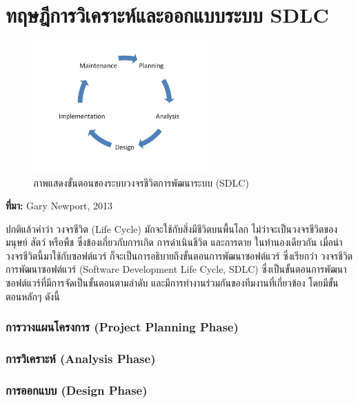 \clearpage


\section{ทฤษฎีการวิเคราะห์และออกแบบระบบ SDLC}

\begin{figure}[h!]
    \centering
    \includegraphics[width=0.6\textwidth]{SDLC.jpeg}
    \caption{ภาพแสดงขั้นตอนของระบบวงจรชีวิตการพัฒนาระบบ (SDLC)}
\end{figure}

\vspace{-1cm}

\begin{center}\textbf{ที่มา:} Gary Newport, 2013\end{center}
\vspace{0.5cm}

ปกติแล้วคำว่า วงจรชีวิต (Life Cycle) มักจะใช้กับสิ่งมีชีวิตบนพื้นโลก ไม่ว่าจะเป็นวงจรชีวิตของมนุษย์ สัตว์ หรือพืช ซึ่งข้องเกี่ยวกับการเกิด การดำเนินชีวิต และการตาย ในทำนองเดียวกัน เมื่อนำวงจรชีวิตนี้มาใช้กับซอฟต์แวร์ ก็จะเป็นการอธิบายถึงขั้นตอนการพัฒนาซอฟต์แวร์ ซึ่งเรียกว่า วงจรชีวิตการพัฒนาซอฟต์แวร์ (Software Development Life Cycle, SDLC) ซึ่งเป็นขั้นตอนการพัฒนาซอฟต์แวร์ที่มีการจัดเป็นขั้นตอนตามลำดับ และมีการทำงานร่วมกันของทีมงานที่เกี่ยวข้อง โดยมีขั้นตอนหลักๆ ดังนี้ \cite{sdlc}

\subsubsection{การวางแผนโครงการ (Project Planning Phase)}

\subsubsection{การวิเคราะห์ (Analysis Phase)}

\subsubsection{การออกแบบ (Design Phase)}

